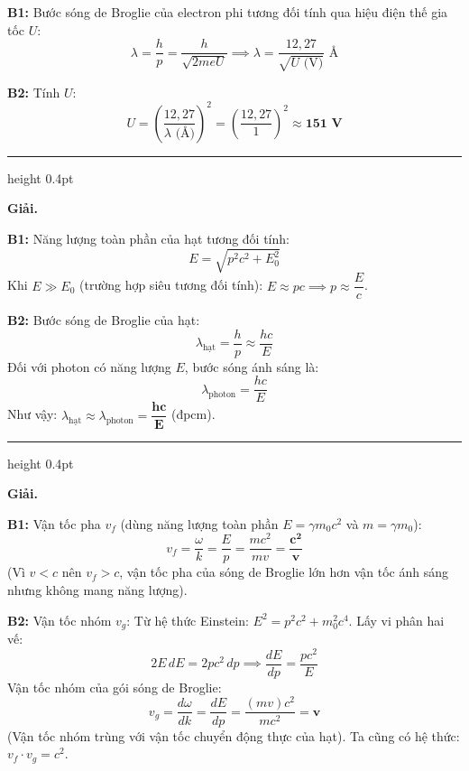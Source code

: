 \documentclass[11pt,a4paper]{article}
\renewcommand{\boldsymbol}[1]{\symbf{#1}}
\let\DeBaiOriginal\DeBai
\renewcommand{\DeBai}[1]{\par\Needspace{5\baselineskip}\DeBaiOriginal{#1}}
\newcommand{\PhanCachBai}{%
  \par\Needspace{7\baselineskip}%
  \addvspace{6pt}%
  {\color{black!40}\hrule height 0.4pt}%
  \nobreak\vspace{7pt}\nobreak
}
\begin{document}
\textbf{B1:} Bước sóng de Broglie của electron phi tương đối tính qua hiệu điện thế gia tốc $U$:
\begin{equation*}
    \lambda = \frac{h}{p} = \frac{h}{\sqrt{2 m e U}} \implies \lambda = \frac{12{,}27}{\sqrt{U\text{ (V)}}}\text{ \AA}
\end{equation*}

\textbf{B2:} Tính $U$:
\begin{equation*}
    U = \left(\frac{12{,}27}{\lambda\text{ (\AA)}}\right)^2 = \left(\frac{12{,}27}{1}\right)^2 \approx \boldsymbol{151\text{ V}}
\end{equation*}

\PhanCachBai


\textbf{Giải.}

\textbf{B1:} Năng lượng toàn phần của hạt tương đối tính:
\begin{equation*}
    E = \sqrt{p^2 c^2 + E_0^2}
\end{equation*}
Khi $E \gg E_0$ (trường hợp siêu tương đối tính): $E \approx p c \implies p \approx \dfrac{E}{c}$.

\textbf{B2:} Bước sóng de Broglie của hạt:
\begin{equation*}
    \lambda_{\text{hạt}} = \frac{h}{p} \approx \frac{h c}{E}
\end{equation*}
Đối với photon có năng lượng $E$, bước sóng ánh sáng là:
\begin{equation*}
    \lambda_{\text{photon}} = \frac{h c}{E}
\end{equation*}
Như vậy: $\lambda_{\text{hạt}} \approx \lambda_{\text{photon}} = \boldsymbol{\dfrac{h c}{E}}$ (đpcm).

\PhanCachBai


\textbf{Giải.}

\textbf{B1:} Vận tốc pha $v_f$ (dùng năng lượng toàn phần $E=\gamma m_0c^2$ và $m=\gamma m_0$):
\begin{equation*}
    v_f = \frac{\omega}{k} = \frac{E}{p} = \frac{m c^2}{m v} = \boldsymbol{\frac{c^2}{v}}
\end{equation*}
(Vì $v < c$ nên $v_f > c$, vận tốc pha của sóng de Broglie lớn hơn vận tốc ánh sáng nhưng không mang năng lượng).

\textbf{B2:} Vận tốc nhóm $v_g$:
Từ hệ thức Einstein: $E^2 = p^2 c^2 + m_0^2 c^4$. Lấy vi phân hai vế:
\begin{equation*}
    2 E \, dE = 2 p c^2 \, dp \implies \frac{dE}{dp} = \frac{p c^2}{E}
\end{equation*}
Vận tốc nhóm của gói sóng de Broglie:
\begin{equation*}
    v_g = \frac{d\omega}{dk} = \frac{dE}{dp} = \frac{(m v) c^2}{m c^2} = \boldsymbol{v}
\end{equation*}
(Vận tốc nhóm trùng với vận tốc chuyển động thực của hạt). Ta cũng có hệ thức: $v_f \cdot v_g = c^2$.
\end{document}
